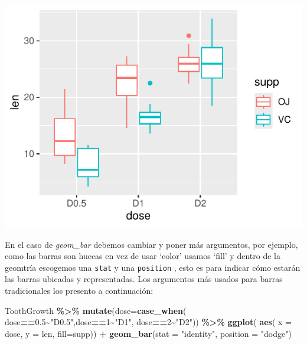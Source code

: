 \documentclass[
]{book}
\newenvironment{Shaded}{\begin{snugshade}}{\end{snugshade}}
\newcommand{\AttributeTok}[1]{\textcolor[rgb]{0.13,0.29,0.53}{#1}}
\newcommand{\DecValTok}[1]{\textcolor[rgb]{0.00,0.00,0.81}{#1}}
\newcommand{\FloatTok}[1]{\textcolor[rgb]{0.00,0.00,0.81}{#1}}
\newcommand{\FunctionTok}[1]{\textcolor[rgb]{0.13,0.29,0.53}{\textbf{#1}}}
\newcommand{\NormalTok}[1]{#1}
\newcommand{\SpecialCharTok}[1]{\textcolor[rgb]{0.81,0.36,0.00}{\textbf{#1}}}
\newcommand{\StringTok}[1]{\textcolor[rgb]{0.31,0.60,0.02}{#1}}
\begin{document}
\begin{center}\includegraphics{_main_files/figure-latex/unnamed-chunk-208-1} \end{center}

En el caso de \emph{geom\_bar} debemos cambiar y poner más argumentos, por ejemplo, como las barras son huecas en vez de usar `color' usamos `fill' y dentro de la geomtría escogemos una \texttt{stat} y una \texttt{position} , esto es para indicar cómo estarán las barras ubicadas y representadas.
Los argumentos más usados para barras tradicionales los presento a continuación:

\begin{Shaded}
\begin{Highlighting}[]
\NormalTok{ToothGrowth }\SpecialCharTok{\%\textgreater{}\%}  \FunctionTok{mutate}\NormalTok{(}\AttributeTok{dose=}\FunctionTok{case\_when}\NormalTok{(}
\NormalTok{  dose}\SpecialCharTok{==}\FloatTok{0.5}\SpecialCharTok{\textasciitilde{}}\StringTok{"D0.5"}\NormalTok{,dose}\SpecialCharTok{==}\DecValTok{1}\SpecialCharTok{\textasciitilde{}}\StringTok{"D1"}\NormalTok{, dose}\SpecialCharTok{==}\DecValTok{2}\SpecialCharTok{\textasciitilde{}}\StringTok{"D2"}\NormalTok{)) }\SpecialCharTok{\%\textgreater{}\%} \FunctionTok{ggplot}\NormalTok{(}
    \FunctionTok{aes}\NormalTok{( }\AttributeTok{x =}\NormalTok{ dose, }\AttributeTok{y =}\NormalTok{ len, }\AttributeTok{fill=}\NormalTok{supp)) }\SpecialCharTok{+}  \FunctionTok{geom\_bar}\NormalTok{(}\AttributeTok{stat =} \StringTok{"identity"}\NormalTok{, }\AttributeTok{position =} \StringTok{"dodge"}\NormalTok{)}
\end{Highlighting}
\end{Shaded}
\end{document}
